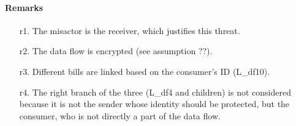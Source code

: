 \paragraph{Remarks}
\begin{enumerate}
	\item[r1.] The misactor is the receiver, which justifies this threat.
	\item[r2.] The data flow is encrypted (see assumption ??). %
	\item[r3.] Different bills are linked based on the consumer's ID (L_df10). 
	\item[r4.] The right branch of the three (L_df4 and children) is not considered
	because it is not the sender whose identity should be protected, but the
	consumer, who is not directly a part of the data flow.
\end{enumerate}

